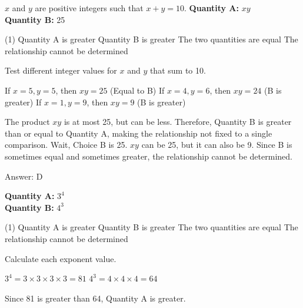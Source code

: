 \documentclass[11pt,paper=a4,answers]{exam}
\begin{document}
\begin{questions}
\question
$x$ and $y$ are positive integers such that $x + y = 10$.
\vspace{5pt}
\textbf{Quantity A: } $xy$ \\
\vspace{5pt}
\textbf{Quantity B: } 25

\begin{tasks}(1)
\task[A)] Quantity A is greater
\task[B)] Quantity B is greater
\task[C)] The two quantities are equal
\task[D)] The relationship cannot be determined
\end{tasks}

\begin{solution}
Test different integer values for $x$ and $y$ that sum to 10.
\vspace{5pt}
\begin{center}
If $x=5, y=5$, then $xy = 25$ (Equal to B)
\vspace{5pt}
If $x=4, y=6$, then $xy = 24$ (B is greater)
\vspace{5pt}
If $x=1, y=9$, then $xy = 9$ (B is greater)
\end{center}
\vspace{5pt}
The product $xy$ is at most 25, but can be less. Therefore, Quantity B is greater than or equal to Quantity A, making the relationship not fixed to a single comparison. Wait, Choice B is 25. $xy$ can be 25, but it can also be 9. Since B is sometimes equal and sometimes greater, the relationship cannot be determined.

Answer: \colorbox{yellow!100}{D}
\end{solution}

\vspace{1cm}

\question
\textbf{Quantity A: } $3^4$ \\
\vspace{5pt}
\textbf{Quantity B: } $4^3$

\begin{tasks}(1)
\task[A)] Quantity A is greater
\task[B)] Quantity B is greater
\task[C)] The two quantities are equal
\task[D)] The relationship cannot be determined
\end{tasks}

\begin{solution}
Calculate each exponent value.
\vspace{5pt}
\begin{center}
$3^4 = 3 \times 3 \times 3 \times 3 = 81$
\vspace{5pt}
$4^3 = 4 \times 4 \times 4 = 64$
\end{center}
\vspace{5pt}
Since 81 is greater than 64, Quantity A is greater.


\end{solution}
\end{questions}
\end{document}
